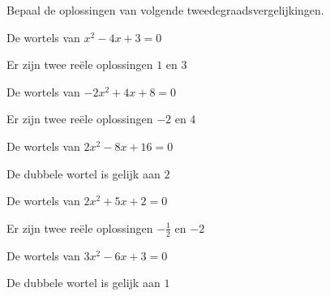 \documentclass{ximera}
\begin{document}
    
    
    
    


    


\begin{exercise} Bepaal de oplossingen van volgende tweedegraadsvergelijkingen. 
  
    \begin{question} De wortels van \( x^2 - 4x + 3    = 0 \) \begin{uitkomst} Er zijn twee reële oplossingen \( 1 \) en  \( 3 \)          \end{uitkomst}\end{question}
    \begin{question} De wortels van \( -2x^2 + 4x + 8  = 0 \) \begin{uitkomst} Er zijn twee reële oplossingen \( -2 \) en  \(4 \)          \end{uitkomst}\end{question}
    \begin{question} De wortels van \( 2x^2 - 8x + 16  = 0 \) \begin{uitkomst} De dubbele wortel is gelijk aan \( 2 \)                     \end{uitkomst}\end{question}
    \begin{question} De wortels van \( 2x^2 + 5x + 2   = 0 \) \begin{uitkomst} Er zijn twee reële oplossingen \( -\frac{1}{2}\) en \(-2 \) \end{uitkomst}\end{question}
    \begin{question} De wortels van \( 3x^2 - 6x + 3   = 0 \) \begin{uitkomst} De dubbele wortel is gelijk aan \( 1   \)                   \end{uitkomst}\end{question}

\end{exercise}
\end{document}
